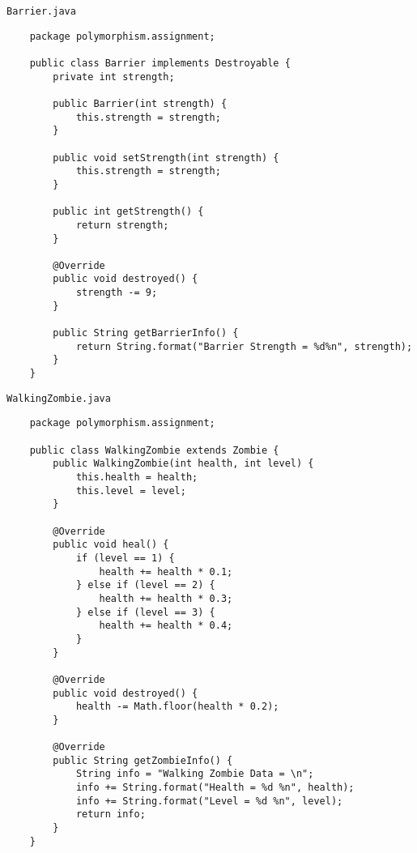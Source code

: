 \documentclass[12pt,titlepage]{article}
\begin{document}
\texttt{Barrier.java}
\begin{verbatim}
    package polymorphism.assignment;

    public class Barrier implements Destroyable {
        private int strength;

        public Barrier(int strength) {
            this.strength = strength;
        }

        public void setStrength(int strength) {
            this.strength = strength;
        }

        public int getStrength() {
            return strength;
        }

        @Override
        public void destroyed() {
            strength -= 9;
        }

        public String getBarrierInfo() {
            return String.format("Barrier Strength = %d%n", strength);
        }
    }
\end{verbatim}

\texttt{WalkingZombie.java}
\begin{verbatim}
    package polymorphism.assignment;

    public class WalkingZombie extends Zombie {
        public WalkingZombie(int health, int level) {
            this.health = health;
            this.level = level;
        }

        @Override
        public void heal() {
            if (level == 1) {
                health += health * 0.1;
            } else if (level == 2) {
                health += health * 0.3;
            } else if (level == 3) {
                health += health * 0.4;
            }
        }

        @Override
        public void destroyed() {
            health -= Math.floor(health * 0.2);
        }

        @Override
        public String getZombieInfo() {
            String info = "Walking Zombie Data = \n";
            info += String.format("Health = %d %n", health);
            info += String.format("Level = %d %n", level);
            return info;
        }
    }
\end{verbatim}
\end{document}
